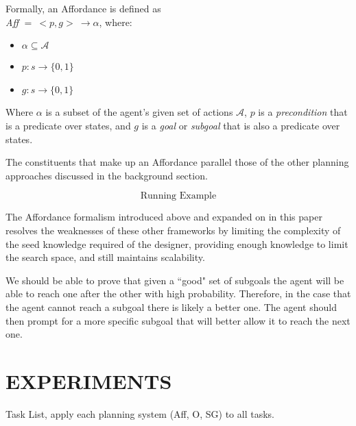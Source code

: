 \documentclass[]{article}
\begin{document}
Formally, an Affordance is defined as \vspace{1 mm} \\
{\it Aff} $ =\ <p,g>\ \longrightarrow \alpha$, where:

\begin{itemize}
\item[] $\alpha \subseteq \mathcal{A}$
\item[] $p : s \longrightarrow \{$0$, 1\}$
\item[] $g : s \longrightarrow \{$0$,1\}$
\end{itemize}

Where $\alpha$ is a subset of the agent's given set of actions $\mathcal{A}$, $p$ is a {\it precondition} that is a predicate over states, and $g$ is a {\it goal} or {\it subgoal} that is also a predicate over states.

The constituents that make up an Affordance parallel those of the other planning approaches discussed in the background section.

\[
\boxed{\text{Running Example}}
\]

The Affordance formalism introduced above and expanded on in this paper resolves the weaknesses of these other frameworks by limiting the complexity of the seed knowledge required of the designer, providing enough knowledge to limit the search space, and still maintains scalability.

We should be able to prove that given a ``good" set of subgoals the agent will be able to reach one after the other with high probability. Therefore, in the case that the agent cannot reach a subgoal there is likely a better one. The agent should then prompt for a more specific subgoal that will better allow it to reach the next one.

\section{EXPERIMENTS}

Task List, apply each planning system (Aff, O, SG) to all tasks.


\end{document}
